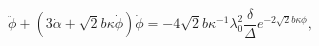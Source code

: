 \begin{equation}
\ddot{\phi}+(3 \dot{\alpha} + \sqrt{2} b \kappa \dot{\phi}) \dot{\phi}
=-4 \sqrt{2} b \kappa^{-1} \lambda_0^2 \frac{\delta}{\Delta} e^{-2 \sqrt{2}b \kappa \phi},
\end{equation}

